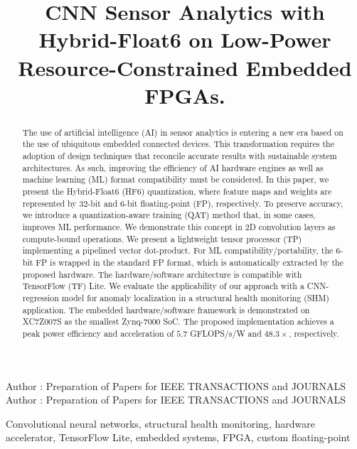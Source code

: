 \title {CNN Sensor Analytics with Hybrid-Float6 on Low-Power Resource-Constrained Embedded FPGAs.}



\markboth
{Author \headeretal: Preparation of Papers for IEEE TRANSACTIONS and JOURNALS}
{Author \headeretal: Preparation of Papers for IEEE TRANSACTIONS and JOURNALS}


\begin{abstract}
The use of artificial intelligence (AI) in sensor analytics is entering a new era based on the use of ubiquitous embedded connected devices. This transformation requires the adoption of design techniques that reconcile accurate results with sustainable system architectures. As such, improving the efficiency of AI hardware engines as well as machine learning (ML) format compatibility must be considered. In this paper, we present the Hybrid-Float6 (HF6) quantization, where feature maps and weights are represented by 32-bit and 6-bit floating-point (FP), respectively. To preserve accuracy, we introduce a quantization-aware training (QAT) method that, in some cases, improves ML performance. We demonstrate this concept in 2D convolution layers as compute-bound operations. We present a lightweight tensor processor (TP) implementing a pipelined vector dot-product. For ML compatibility/portability, the 6-bit FP is wrapped in the standard FP format, which is automatically extracted by the proposed hardware. The hardware/software architecture is compatible with TensorFlow (TF) Lite. We evaluate the applicability of our approach with a CNN-regression model for anomaly localization in a structural health monitoring (SHM) application. The embedded hardware/software framework is demonstrated on XC7Z007S as the smallest Zynq-7000 SoC. The proposed implementation achieves a peak power efficiency and acceleration of $5.7$ GFLOPS/s/W and $48.3\times$, respectively.
\end{abstract}

\begin{keywords}
Convolutional neural networks, structural health monitoring, hardware accelerator, TensorFlow Lite, embedded systems, FPGA, custom floating-point
\end{keywords}

\titlepgskip=-15pt

\maketitle